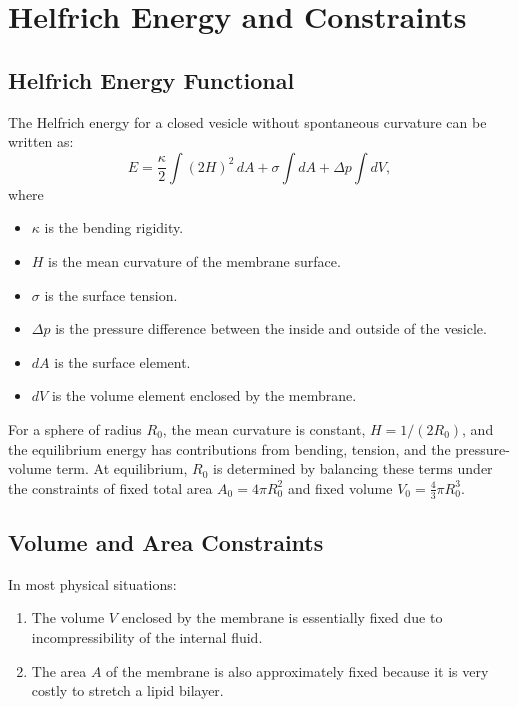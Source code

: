 \documentclass[12pt,a4paper]{article}
\begin{document}
\section{Helfrich Energy and Constraints}

\subsection{Helfrich Energy Functional}

The Helfrich energy \cite{Helfrich1973} for a closed vesicle without spontaneous curvature can be written as:
\begin{equation}
E = \frac{\kappa}{2} \int (2H)^2\, dA + \sigma \int dA + \Delta p \int dV,
\end{equation}
where
\begin{itemize}
    \item $\kappa$ is the bending rigidity.
    \item $H$ is the mean curvature of the membrane surface.
    \item $\sigma$ is the surface tension.
    \item $\Delta p$ is the pressure difference between the inside and outside of the vesicle.
    \item $dA$ is the surface element.
    \item $dV$ is the volume element enclosed by the membrane.
\end{itemize}

For a sphere of radius $R_0$, the mean curvature is constant, $H = 1/(2R_0)$, and the equilibrium energy has contributions from bending, tension, and the pressure-volume term. At equilibrium, $R_0$ is determined by balancing these terms under the constraints of fixed total area $A_0=4\pi R_0^2$ and fixed volume $V_0=\frac{4}{3}\pi R_0^3$.

\subsection{Volume and Area Constraints}

In most physical situations:
\begin{enumerate}
    \item The volume $V$ enclosed by the membrane is essentially fixed due to incompressibility of the internal fluid.
    \item The area $A$ of the membrane is also approximately fixed because it is very costly to stretch a lipid bilayer.
\end{enumerate}
\end{document}
